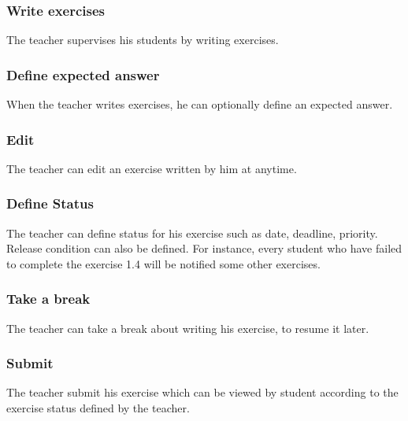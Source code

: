 		\subsubsection{Write exercises}
			The teacher supervises his students by writing exercises.
		\subsubsection{Define expected answer}
			When the teacher writes exercises, he can optionally define an expected answer.
		\subsubsection{Edit}
			The teacher can edit an exercise written by him at anytime.
		\subsubsection{Define Status}
			The teacher can define status for his exercise such as date, deadline, priority.\\
			Release condition can also be defined. For instance, every student who have failed to complete the exercise 1.4 will be notified some other exercises. 
		\subsubsection{Take a break}
			The teacher can take a break about writing his exercise, to resume it later.
		\subsubsection{Submit}
			The teacher submit his exercise which can be viewed by student according to the exercise status defined by the teacher.
		
	\newpage
